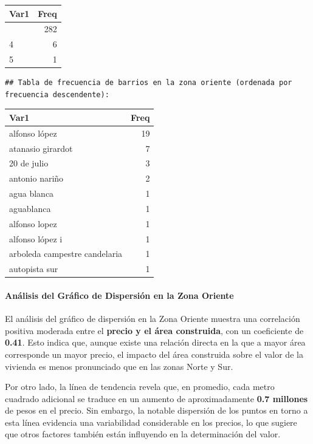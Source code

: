 \documentclass[
]{article}
\begin{document}
\begin{longtable}[]{@{}lr@{}}
\toprule\noalign{}
Var1 & Freq \\
\midrule\noalign{}
\endhead
\bottomrule\noalign{}
\endlastfoot
3 & 282 \\
4 & 6 \\
5 & 1 \\
\end{longtable}

\begin{verbatim}
## Tabla de frecuencia de barrios en la zona oriente (ordenada por frecuencia descendente):
\end{verbatim}

\begin{longtable}[]{@{}lr@{}}
\toprule\noalign{}
Var1 & Freq \\
\midrule\noalign{}
\endhead
\bottomrule\noalign{}
\endlastfoot
alfonso lópez & 19 \\
atanasio girardot & 7 \\
20 de julio & 3 \\
antonio nariño & 2 \\
agua blanca & 1 \\
aguablanca & 1 \\
alfonso lopez & 1 \\
alfonso lópez i & 1 \\
arboleda campestre candelaria & 1 \\
autopista sur & 1 \\
\end{longtable}

\paragraph{\texorpdfstring{\textbf{Análisis del Gráfico de Dispersión en
la Zona
Oriente}}{Análisis del Gráfico de Dispersión en la Zona Oriente}}\label{anuxe1lisis-del-gruxe1fico-de-dispersiuxf3n-en-la-zona-oriente}

El análisis del gráfico de dispersión en la Zona Oriente muestra una
correlación positiva moderada entre el \textbf{precio y el área
construida}, con un coeficiente de \textbf{0.41}. Esto indica que,
aunque existe una relación directa en la que a mayor área corresponde un
mayor precio, el impacto del área construida sobre el valor de la
vivienda es menos pronunciado que en las zonas Norte y Sur.

Por otro lado, la línea de tendencia revela que, en promedio, cada metro
cuadrado adicional se traduce en un aumento de aproximadamente
\textbf{0.7 millones} de pesos en el precio. Sin embargo, la notable
dispersión de los puntos en torno a esta línea evidencia una
variabilidad considerable en los precios, lo que sugiere que otros
factores también están influyendo en la determinación del valor.
\end{document}
